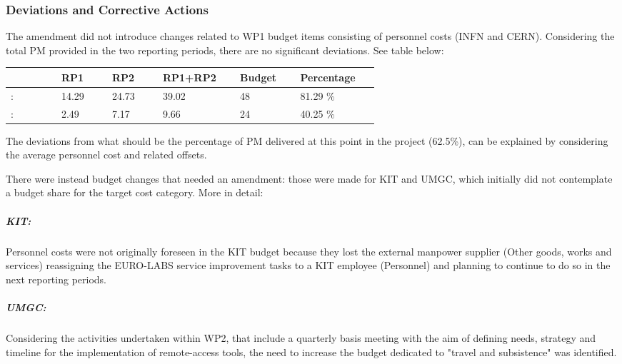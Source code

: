 \subsubsection*{Deviations and Corrective Actions}
\label{sec:wp1_deviations}

The amendment did not introduce changes related to WP1 budget items consisting of personnel costs (INFN and CERN).
Considering the total PM provided in the two reporting periods, there are no significant deviations. See table below:

{\fontsize{9}{11}\selectfont
\begin{center}
  \begin{tabular}[t]{!{\color{mygray}\vrule}p{0.10\linewidth}!
  {\color{mygray}\vrule}p{0.10\linewidth}!
  {\color{mygray}\vrule}p{0.10\linewidth}!
  {\color{mygray}\vrule}p{0.10\linewidth}!
  {\color{mygray}\vrule}p{0.10\linewidth}!
 {\color{mygray}\vrule}p{0.10\linewidth}!{\color{mygray}\vrule} } \hline
     & {\bf RP1} & {\bf RP2} & {\bf RP1+RP2} & {\bf Budget} & {\bf Percentage} \\ \hline
    : & 14.29 &  24.73 & 39.02 & 48 & 81.29 \% \\ \hline
   : & 2.49   &  7.17  & 9.66  & 24 & 40.25 \% \\ \hline 
  \end{tabular}
\end{center}
}

The deviations from what should be the percentage of PM delivered at this point in the project (62.5\%), can be explained by considering the average personnel cost and related offsets.

There were instead budget changes that needed an amendment: those were made for KIT and UMGC, which initially did not contemplate a budget share for the target cost category. More in detail:
\subparagraph{KIT:} Personnel costs were not originally foreseen in the KIT budget because they lost the external manpower supplier (Other goods, works and services) reassigning the EURO-LABS service improvement tasks to a KIT employee (Personnel) and planning to continue to do so in the next reporting periods.
\subparagraph{UMGC:} Considering the activities undertaken within WP2, that include a quarterly basis meeting with the aim of defining needs, strategy and timeline for the implementation of remote-access tools, the need to increase the budget dedicated to "travel and subsistence" was identified.


